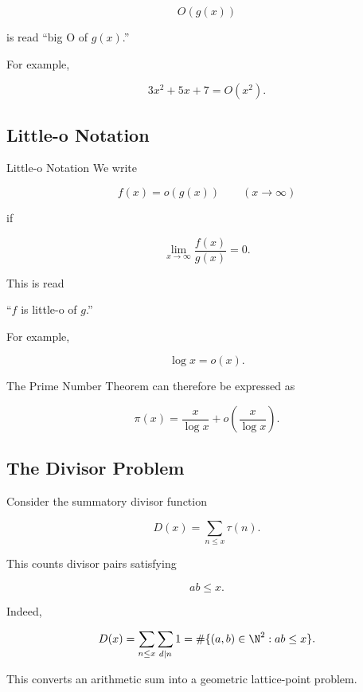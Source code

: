 \[ O(g(x)) \]

is read ``big O of \(g(x)\).''

For example,

\[ 3x^2+5x+7=O(x^2). \]

\subsection{Little-o Notation}
\label{subsec:little-o-number-theory}

\begin{definitionbox}{Little-o Notation}
We write

\[ f(x)=o(g(x))\qquad(x\to\infty) \]

if

\[ \lim_{x\to\infty}\frac{f(x)}{g(x)}=0. \]
\end{definitionbox}

This is read

\begin{center}
``\(f\) is little-o of \(g\).''
\end{center}

For example,

\[ \log x=o(x). \]

The Prime Number Theorem can therefore be expressed as

\[ \pi(x)=\frac{x}{\log x}+o\left(\frac{x}{\log x}\right). \]

\subsection{The Divisor Problem}
\label{subsec:dirichlet-divisor-problem}

Consider the summatory divisor function

\[ D(x)=\sum_{n\leq x}\tau(n). \]

This counts divisor pairs satisfying

\[ ab\leq x. \]

Indeed,

\[
D(x)
=
\sum_{n\leq x}\sum_{d\mid n}1
=
\#\{(a,b)\in\N^2:ab\leq x\}.
\]

This converts an arithmetic sum into a geometric lattice-point problem.

